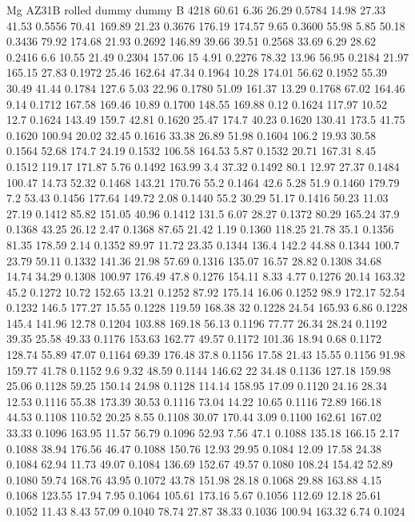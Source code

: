 Mg AZ31B rolled
dummy
dummy
B 4218
60.61	6.36	26.29	0.5784
14.98	27.33	41.53	0.5556
70.41	169.89	21.23	0.3676
176.19	174.57	9.65	0.3600
55.98	5.85	50.18	0.3436
79.92	174.68	21.93	0.2692
146.89	39.66	39.51	0.2568
33.69	6.29	28.62	0.2416
6.6	10.55	21.49	0.2304
157.06	15	4.91	0.2276
78.32	13.96	56.95	0.2184
21.97	165.15	27.83	0.1972
25.46	162.64	47.34	0.1964
10.28	174.01	56.62	0.1952
55.39	30.49	41.44	0.1784
127.6	5.03	22.96	0.1780
51.09	161.37	13.29	0.1768
67.02	164.46	9.14	0.1712
167.58	169.46	10.89	0.1700
148.55	169.88	0.12	0.1624
117.97	10.52	12.7	0.1624
143.49	159.7	42.81	0.1620
25.47	174.7	40.23	0.1620
130.41	173.5	41.75	0.1620
100.94	20.02	32.45	0.1616
33.38	26.89	51.98	0.1604
106.2	19.93	30.58	0.1564
52.68	174.7	24.19	0.1532
106.58	164.53	5.87	0.1532
20.71	167.31	8.45	0.1512
119.17	171.87	5.76	0.1492
163.99	3.4	37.32	0.1492
80.1	12.97	27.37	0.1484
100.47	14.73	52.32	0.1468
143.21	170.76	55.2	0.1464
42.6	5.28	51.9	0.1460
179.79	7.2	53.43	0.1456
177.64	149.72	2.08	0.1440
55.2	30.29	51.17	0.1416
50.23	11.03	27.19	0.1412
85.82	151.05	40.96	0.1412
131.5	6.07	28.27	0.1372
80.29	165.24	37.9	0.1368
43.25	26.12	2.47	0.1368
87.65	21.42	1.19	0.1360
118.25	21.78	35.1	0.1356
81.35	178.59	2.14	0.1352
89.97	11.72	23.35	0.1344
136.4	142.2	44.88	0.1344
100.7	23.79	59.11	0.1332
141.36	21.98	57.69	0.1316
135.07	16.57	28.82	0.1308
34.68	14.74	34.29	0.1308
100.97	176.49	47.8	0.1276
154.11	8.33	4.77	0.1276
20.14	163.32	45.2	0.1272
10.72	152.65	13.21	0.1252
87.92	175.14	16.06	0.1252
98.9	172.17	52.54	0.1232
146.5	177.27	15.55	0.1228
119.59	168.38	32	0.1228
24.54	165.93	6.86	0.1228
145.4	141.96	12.78	0.1204
103.88	169.18	56.13	0.1196
77.77	26.34	28.24	0.1192
39.35	25.58	49.33	0.1176
153.63	162.77	49.57	0.1172
101.36	18.94	0.68	0.1172
128.74	55.89	47.07	0.1164
69.39	176.48	37.8	0.1156
17.58	21.43	15.55	0.1156
91.98	159.77	41.78	0.1152
9.6	9.32	48.59	0.1144
146.62	22	34.48	0.1136
127.18	159.98	25.06	0.1128
59.25	150.14	24.98	0.1128
114.14	158.95	17.09	0.1120
24.16	28.34	12.53	0.1116
55.38	173.39	30.53	0.1116
73.04	14.22	10.65	0.1116
72.89	166.18	44.53	0.1108
110.52	20.25	8.55	0.1108
30.07	170.44	3.09	0.1100
162.61	167.02	33.33	0.1096
163.95	11.57	56.79	0.1096
52.93	7.56	47.1	0.1088
135.18	166.15	2.17	0.1088
38.94	176.56	46.47	0.1088
150.76	12.93	29.95	0.1084
12.09	17.58	24.38	0.1084
62.94	11.73	49.07	0.1084
136.69	152.67	49.57	0.1080
108.24	154.42	52.89	0.1080
59.74	168.76	43.95	0.1072
43.78	151.98	28.18	0.1068
29.88	163.88	4.15	0.1068
123.55	17.94	7.95	0.1064
105.61	173.16	5.67	0.1056
112.69	12.18	25.61	0.1052
11.43	8.43	57.09	0.1040
78.74	27.87	38.33	0.1036
100.94	163.32	6.74	0.1024
